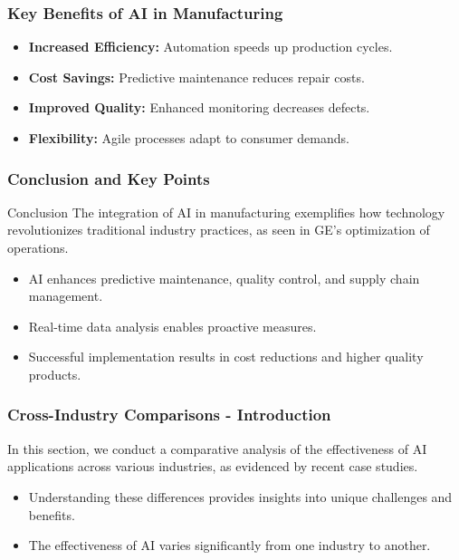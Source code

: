 \documentclass{beamer}
\begin{document}
\begin{frame}[fragile]
    \frametitle{Key Benefits of AI in Manufacturing}
    \begin{itemize}
        \item \textbf{Increased Efficiency:} Automation speeds up production cycles.
        \item \textbf{Cost Savings:} Predictive maintenance reduces repair costs.
        \item \textbf{Improved Quality:} Enhanced monitoring decreases defects.
        \item \textbf{Flexibility:} Agile processes adapt to consumer demands.
    \end{itemize}
\end{frame}

\begin{frame}[fragile]
    \frametitle{Conclusion and Key Points}
    \begin{block}{Conclusion}
        The integration of AI in manufacturing exemplifies how technology revolutionizes traditional industry practices, as seen in GE's optimization of operations.
    \end{block}
    
    \begin{itemize}
        \item AI enhances predictive maintenance, quality control, and supply chain management.
        \item Real-time data analysis enables proactive measures.
        \item Successful implementation results in cost reductions and higher quality products.
    \end{itemize}
\end{frame}

\begin{frame}[fragile]
    \frametitle{Cross-Industry Comparisons - Introduction}
    In this section, we conduct a comparative analysis of the effectiveness of AI applications across various industries, as evidenced by recent case studies. 
    \begin{itemize}
        \item Understanding these differences provides insights into unique challenges and benefits.
        \item The effectiveness of AI varies significantly from one industry to another.
    \end{itemize}
\end{frame}
\end{document}

